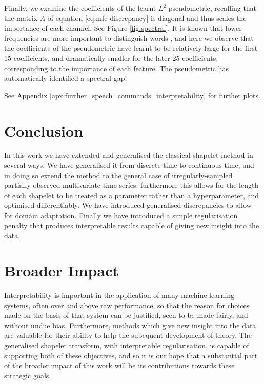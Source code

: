 \documentclass{article}
\theoremstyle{plain}
\theoremstyle{definition}
\begin{document}
Finally, we examine the coefficients of the learnt $L^2$ pseudometric, recalling that the matrix $A$ of equation \eqref{eq:mfc-discrepancy} is diagonal and thus scales the importance of each channel. See Figure \ref{fig:spectral}. It is known that lower frequencies are more important to distinguish words \cite{monson2019maximum}, and here we observe that the coefficients of the pseudometric have learnt to be relatively large for the first 15 coefficients, and dramatically smaller for the later 25 coefficients, corresponding to the importance of each feature. The pseudometric has automatically identified a spectral gap!

See Appendix \ref{apx:further_speech_commands_interpretability} for further plots.




	\section{Conclusion}
	In this work we have extended and generalised the classical shapelet method in several ways. We have generalised it from discrete time to continuous time, and in doing so extend the method to the general case of irregularly-sampled partially-observed multivariate time series; furthermore this allows for the length of each shapelet to be treated as a parameter rather than a hyperparameter, and optimised differentiably. We have introduced generalised discrepancies to allow for domain adaptation. Finally we have introduced a simple regularisation penalty that produces interpretable results capable of giving new insight into the data.
	
	\section*{Broader Impact}
	Interpretability is important in the application of many machine learning systems, often over and above raw performance, so that the reason for choices made on the basis of that system can be justified, seen to be made fairly, and without undue bias. Furthermore, methods which give new insight into the data are valuable for their ability to help the subequent development of theory. The generalised shapelet transform, with interpretable regularisation, is capable of supporting both of these objectives, and so it is our hope that a substantial part of the broader impact of this work will be its contributions towards these strategic goals.
	
\end{document}
